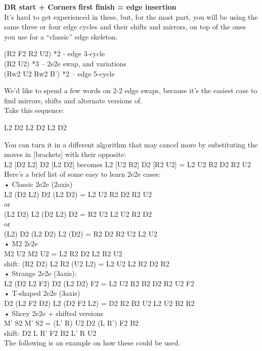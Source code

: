 \documentclass[11pt,a4paper]{book}
\begin{document}
\textbf{ DR start + Corners first finish = edge insertion}\\
\newline
It’s hard to get experienced in these, but, for the most part, you will be using the same three or four edge cycles and their shifts and mirrors, on top of the ones you use for a “classic” edge skeleton.\\
\begin{center}
(R2 F2 R2 U2) *2 - edge 3-cycle\\
(R2 U2) *3 – 2e2e swap, and variations\\
(Rw2 U2 Rw2 B’) *2 – edge 5-cycle\\
\end{center}
\bigskip
We’d like to spend a few words on 2-2 edge swaps, because it’s the easiest case to find mirrors, shifts and alternate versions of.\\
\newpage
\hfill \break
Take this sequence:\\
\begin{center}
L2 D2 L2 D2 L2 D2
\end{center}
\bigskip
You can turn it in a different algorithm that may cancel more by substituting the moves in [brackets] with their opposite:\\
L2 [D2 L2] D2 [L2 D2] becomes  L2 [U2 R2] D2 [R2 U2] =  L2 U2 R2 D2 R2 U2\\
\bigskip
\newline
Here’s a brief list of some easy to learn 2e2e cases:\\
\bigskip
\newline
• Classic 2e2e (2axis) \\
L2 (D2 L2) D2 (L2 D2) =  L2 U2 R2 D2 R2 U2\\
or\\
(L2 D2) L2 (D2 L2) D2 =  R2 U2 L2 U2 R2 D2\\
or\\
(L2) D2 (L2 D2) L2 (D2) =  R2 D2 R2 U2 L2 U2 \\
\newline
• M2 2e2e\\
M2 U2 M2 U2 = L2 R2 D2 L2 R2 U2 \\
shift: (R2 D2) L2 R2 (U2 L2) =  L2 U2 L2 R2 D2 R2\\
\newline
• Strange 2e2e (3axis):\\
L2 (D2 L2 F2) D2 (L2 D2) F2 =  L2 U2 R2 B2 D2 R2 U2 F2\\
\newline
• T-shaped 2e2e (3axis)\\
D2 (L2 F2 D2) L2 (D2 F2 L2) =  D2 R2 B2 U2 L2 U2 B2 R2\\
\newline
• Slicey 2e2e + shifted versions\\
M' S2 M’ S2 = (L' R) U2 D2 (L R') F2 B2\\
shift: D2 L R' F2 B2 L' R U2\\
\newline
The following is an example on how these could be used.\\
\end{document}
